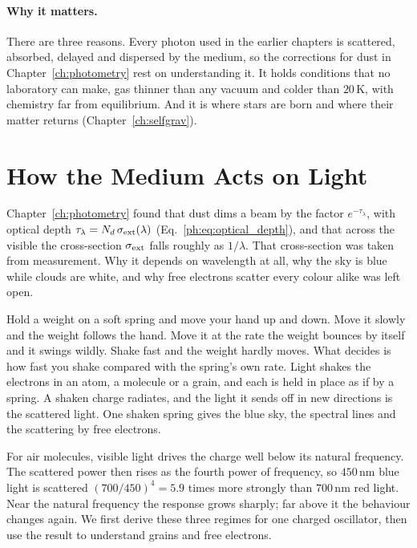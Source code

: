 \paragraph{Why it matters.} There are three reasons. Every photon used in the earlier chapters is scattered, absorbed, delayed and dispersed by the medium, so the corrections for dust in Chapter~\ref{ch:photometry} rest on understanding it. It holds conditions that no laboratory can make, gas thinner than any vacuum and colder than $20\,\mathrm K$, with chemistry far from equilibrium. And it is where stars are born and where their matter returns (Chapter~\ref{ch:selfgrav}).

\section{How the Medium Acts on Light}
\label{sec:ism_extinction}

Chapter~\ref{ch:photometry} found that dust dims a beam by the factor $e^{-\tau_\lambda}$, with optical depth $\tau_\lambda=N_d\,\sigma_{\rm ext}(\lambda)$ (Eq.~\eqref{ph:eq:optical_depth}), and that across the visible the cross-section $\sigma_{\rm ext}$ falls roughly as $1/\lambda$. That cross-section was taken from measurement. Why it depends on wavelength at all, why the sky is blue while clouds are white, and why free electrons scatter every colour alike was left open.

Hold a weight on a soft spring and move your hand up and down. Move it slowly and the weight follows the hand. Move it at the rate the weight bounces by itself and it swings wildly. Shake fast and the weight hardly moves. What decides is how fast you shake compared with the spring's own rate. Light shakes the electrons in an atom, a molecule or a grain, and each is held in place as if by a spring. A shaken charge radiates, and the light it sends off in new directions is the scattered light. One shaken spring gives the blue sky, the spectral lines and the scattering by free electrons.

For air molecules, visible light drives the charge well below its natural frequency. The scattered power then rises as the fourth power of frequency, so $450\,\mathrm{nm}$ blue light is scattered $(700/450)^4=5.9$ times more strongly than $700\,\mathrm{nm}$ red light. Near the natural frequency the response grows sharply; far above it the behaviour changes again. We first derive these three regimes for one charged oscillator, then use the result to understand grains and free electrons.


